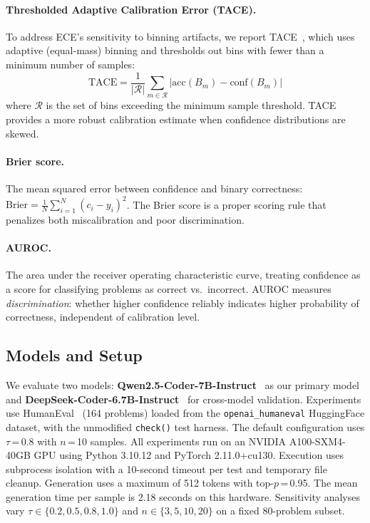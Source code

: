 \documentclass{article}
\begin{document}
\paragraph{Thresholded Adaptive Calibration Error (TACE).}
To address ECE's sensitivity to binning artifacts, we report TACE~\citep{nixon2019measuring}, which uses adaptive (equal-mass) binning and thresholds out bins with fewer than a minimum number of samples:
\begin{equation}
  \text{TACE} = \frac{1}{|\mathcal{R}|}\sum_{m \in \mathcal{R}} \left| \text{acc}(B_m) - \text{conf}(B_m) \right|
  \label{eq:tace}
\end{equation}
where $\mathcal{R}$ is the set of bins exceeding the minimum sample threshold. TACE provides a more robust calibration estimate when confidence distributions are skewed.

\paragraph{Brier score.}
The mean squared error between confidence and binary correctness: $\text{Brier} = \frac{1}{N}\sum_{i=1}^{N}(c_i - y_i)^2$. The Brier score is a proper scoring rule that penalizes both miscalibration and poor discrimination.

\paragraph{AUROC.}
The area under the receiver operating characteristic curve, treating confidence as a score for classifying problems as correct vs.\ incorrect. AUROC measures \emph{discrimination}: whether higher confidence reliably indicates higher probability of correctness, independent of calibration level.

\subsection{Models and Setup}
\label{sec:setup}

We evaluate two models: \textbf{Qwen2.5-Coder-7B-Instruct}~\citep{hui2024qwen25coder} as our primary model and \textbf{DeepSeek-Coder-6.7B-Instruct}~\citep{guo2024deepseek} for cross-model validation. Experiments use HumanEval~\citep{chen2021evaluating} (164 problems) loaded from the \texttt{openai\_humaneval} HuggingFace dataset, with the unmodified \texttt{check()} test harness. The default configuration uses $\tau$\,=\,0.8 with $n$\,=\,10 samples. All experiments run on an NVIDIA A100-SXM4-40GB GPU using Python 3.10.12 and PyTorch 2.11.0+cu130. Execution uses subprocess isolation with a 10-second timeout per test and temporary file cleanup. Generation uses a maximum of 512 tokens with top-$p$\,=\,0.95. The mean generation time per sample is 2.18 seconds on this hardware. Sensitivity analyses vary $\tau \in \{0.2, 0.5, 0.8, 1.0\}$ and $n \in \{3, 5, 10, 20\}$ on a fixed 80-problem subset.
\end{document}
